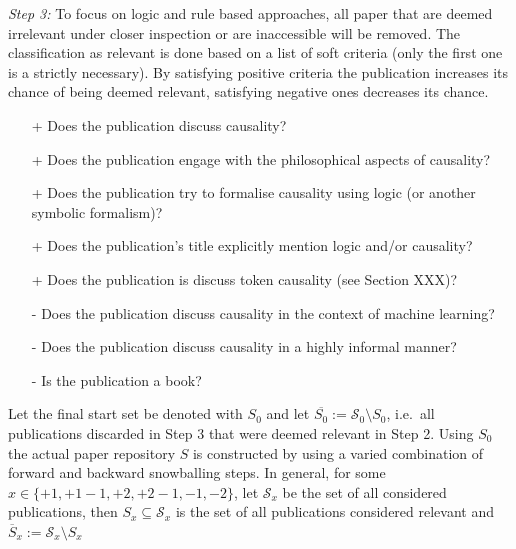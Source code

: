 \documentclass[11pt,a4paper]{book}
\theoremstyle{definition}
\theoremstyle{definition}
\theoremstyle{definition}
\theoremstyle{remark}
\newcommand{\tpset}{\mathcal{S}}
\newcommand{\tpsetz}{\mathcal{S}_{\mathit{0}}}
\newcommand{\pset}{S}
\newcommand{\psetz}{S_{\mathit{0}}}
\newcommand{\npset}{\overline{\pset}}
\newcommand{\npsetz}{\overline{\psetz}}
\begin{document}
\emph{Step 3:}  To focus on logic and rule based approaches, all paper that are deemed irrelevant under closer inspection or are inaccessible
will be removed. The classification as relevant is done based on a list of soft criteria (only the first one is a strictly necessary). By satisfying positive criteria the publication increases its chance of being deemed relevant, satisfying negative ones decreases its chance.
\begin{itemize}
\item[+] Does the publication discuss causality? 
\item[+] Does the publication engage with the philosophical aspects of causality?
\item[+] Does the publication try to formalise causality using logic (or another symbolic formalism)?
\item[+] Does the publication's title explicitly mention logic and/or causality?
\item[+] Does the publication is discuss token causality (see Section XXX)?
\item[-] Does the publication discuss causality in the context of machine learning?
\item[-] Does the publication discuss causality in a highly informal manner?
\item[-] Is the publication a book?
\end{itemize}
Let the final start set be denoted with $\psetz$ and let $\npsetz:=\tpsetz \setminus \psetz $, i.e.\ all publications discarded in Step 3 that were deemed relevant in Step 2. 
Using $\psetz$ the actual paper repository $\pset$ is constructed by using a varied combination of forward and backward snowballing steps.
In general, for some $x \in \{ \mathit{+1}, \mathit{+1-1}, \mathit{+2}, \mathit{+2-1}, \mathit{-1}, \mathit{-2}\}$, let $\tpset_x$ be the set of all considered publications, then $\pset_x \subseteq \tpset_x$ is the set of all publications considered relevant and $\npset_x := \tpset_x \setminus \pset_x$ 
\end{document}

